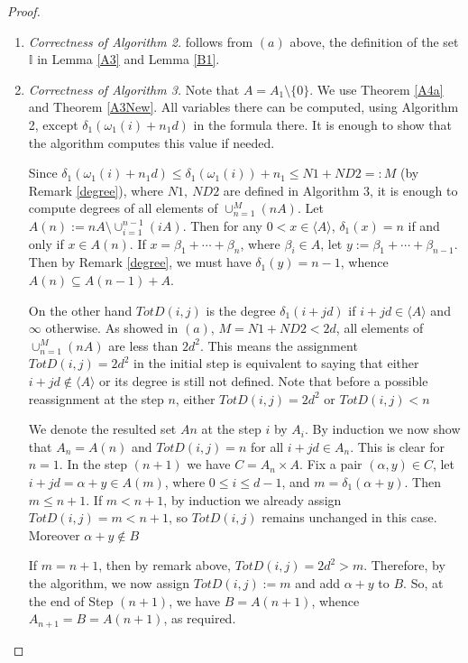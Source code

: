 \documentclass[11pt]{article}
\def\Iset{{\mathbb I}}
\theoremstyle{remark}
\theoremstyle{definition}
\begin{document}
\begin{proof}
\begin{enumerate}[\((a)\)]
When the algorithm terminates (at Step $N$), we see that for any $i\leq d-1$ we have  $Ap(i) = \omega(i)$ and $D(i) = \delta(\omega(i))$. That means the output gives us the correct answer.
\item \textit{Correctness of Algorithm 2.} follows from \((a)\) above,  the definition of  the set $\Iset$ in Lemma \ref{A3} and Lemma \ref{B1}.
\item \textit{Correctness of Algorithm 3.} Note that $A = A_1\setminus \{0\}$. We use Theorem \ref{A4a} and Theorem \ref{A3New}. All variables there can be computed, using Algorithm 2, except $\delta_1(\omega_1(i) + n_1d)$ in the formula there. It is enough to show that the algorithm computes this value if needed.

Since $\delta_1(\omega_1(i) + n_1d) \leq \delta_1(\omega_1(i)) + n_1 \leq N1+ND2 =: M$ (by Remark \ref{degree}), where $N1,\ ND2$ are defined in Algorithm 3, it is enough  to compute degrees of all elements of $\cup_{n=1}^{M} (nA)$. 
Let $A(n):= nA \setminus \cup_{i=1}^{n-1} (iA)$. Then for any $0< x\in \langle A\rangle$, $\delta_1(x) =n$ if and only if $x\in A(n)$. If $x = \beta_1 + \cdots + \beta_n$, where $\beta_i \in A$, let $y:= \beta_1 + \cdots + \beta_{n-1}$. Then by Remark \ref{degree}, we must have $\delta_1(y) = n-1$, whence $A(n) \subseteq A(n-1) + A$. 

On the other hand $TotD(i,j)$ is the degree $\delta_1(i + jd)$ if $i+jd\in \langle A \rangle$ and $\infty$ otherwise. As showed in \((a)\), $M= N1 + ND2 < 2d$, all elements of $\cup_{n=1}^{M} (nA)$ are less than $2d^2$. This means the assignment $TotD(i,j) = 2d^2$ in the initial step is equivalent to saying that either $i+jd \not\in \langle A \rangle$ or its degree is still not defined. Note that before a possible reassignment at the step $n$, either $TotD(i,j) = 2d^2$ or $TotD(i,j) < n$

We denote the resulted set $An$ at the step $i$ by $A_i$.  By induction we now show that $A_n = A(n)$ and $TotD(i,j) = n$ for all $i+jd \in A_n$. This is clear for $n=1$. In the step $(n+1)$ we have $C= A_n \times A$. Fix a pair  $(\alpha, y)\in C$, let  $i+jd = \alpha + y \in A(m)$, where $0\leq i\leq d-1$, and $m= \delta_1(\alpha + y)$. Then $m\leq n +1$. If $m< n+1$,  by induction we already assign $TotD(i,j) = m < n+1$, so $TotD(i,j)$ remains unchanged in this case. Moreover $ \alpha + y \not\in B$

If $m= n+1$, then by remark above, $TotD(i,j) = 2d^2 >m$. Therefore, by the algorithm, we now assign $TotD(i,j) := m $ and add $\alpha+y$ to $B$. So, at the end of Step $(n+1)$, we have $B= A(n+1)$, whence $A_{n+1}= B = A(n+1)$, as required.
\end{enumerate}
\end{proof}
\end{document}
